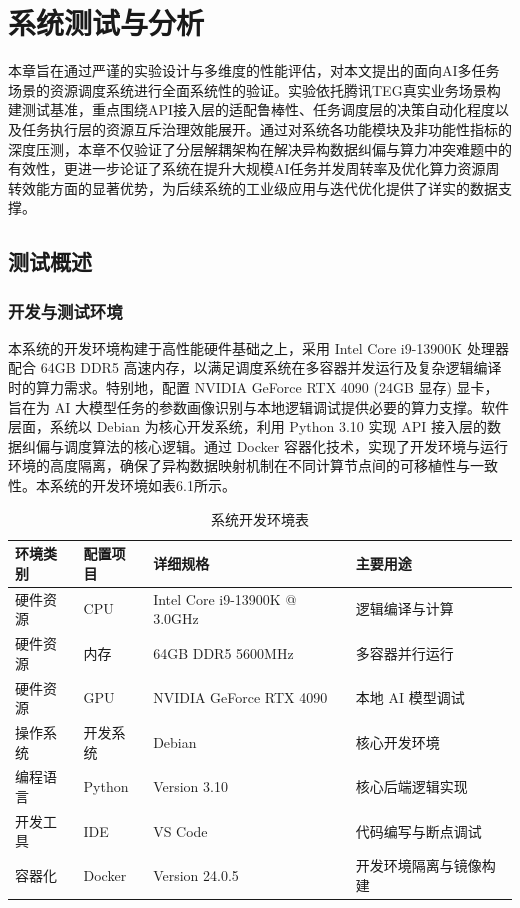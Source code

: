 \chapter{系统测试与分析}

本章旨在通过严谨的实验设计与多维度的性能评估，对本文提出的面向AI多任务场景的资源调度系统进行全面系统性的验证。实验依托腾讯TEG真实业务场景构建测试基准，重点围绕API接入层的适配鲁棒性、任务调度层的决策自动化程度以及任务执行层的资源互斥治理效能展开。通过对系统各功能模块及非功能性指标的深度压测，本章不仅验证了分层解耦架构在解决异构数据纠偏与算力冲突难题中的有效性，更进一步论证了系统在提升大规模AI任务并发周转率及优化算力资源周转效能方面的显著优势，为后续系统的工业级应用与迭代优化提供了详实的数据支撑。

\section{测试概述}

\subsection{开发与测试环境}

本系统的开发环境构建于高性能硬件基础之上，采用 Intel Core i9-13900K 处理器配合 64GB DDR5 高速内存，以满足调度系统在多容器并发运行及复杂逻辑编译时的算力需求。特别地，配置 NVIDIA GeForce RTX 4090 (24GB 显存) 显卡，旨在为 AI 大模型任务的参数画像识别与本地逻辑调试提供必要的算力支撑。软件层面，系统以 Debian 为核心开发系统，利用 Python 3.10 实现 API 接入层的数据纠偏与调度算法的核心逻辑。通过 Docker 容器化技术，实现了开发环境与运行环境的高度隔离，确保了异构数据映射机制在不同计算节点间的可移植性与一致性。本系统的开发环境如表6.1所示。

\begin{table}[htbp]
\centering
\caption{系统开发环境表}
\begin{tabularx}{\textwidth}{llXl}
\toprule
\textbf{环境类别} & \textbf{配置项目} & \textbf{详细规格} & \textbf{主要用途} \\
\midrule
硬件资源 & CPU & Intel Core i9-13900K @ 3.0GHz & 逻辑编译与计算 \\
硬件资源 & 内存 & 64GB DDR5 5600MHz & 多容器并行运行 \\
硬件资源 & GPU & NVIDIA GeForce RTX 4090 & 本地 AI 模型调试 \\
操作系统 & 开发系统 & Debian & 核心开发环境 \\
编程语言 & Python & Version 3.10 & 核心后端逻辑实现 \\
开发工具 & IDE & VS Code & 代码编写与断点调试 \\
容器化 & Docker & Version 24.0.5 & 开发环境隔离与镜像构建 \\
\bottomrule
\end{tabularx}
\end{table}

